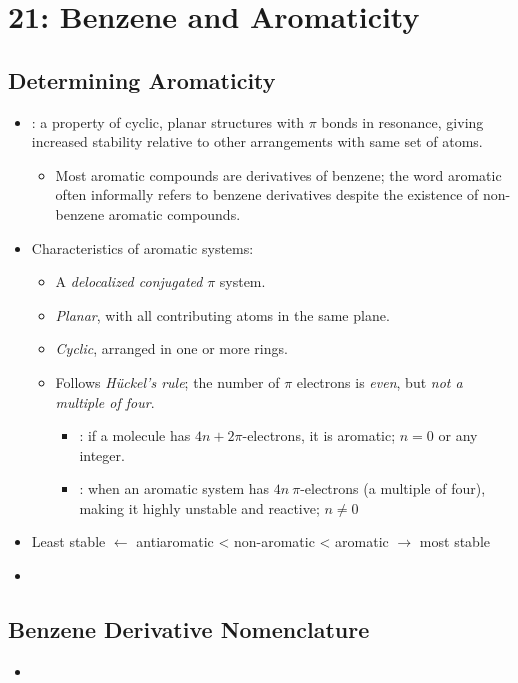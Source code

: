 \chapter{21: Benzene and Aromaticity}\label{21: Benzene and Aromaticity}

\section{Determining Aromaticity}\label{Determining Aromaticity}
\begin{itemize}
  \item {}: a property of cyclic, planar structures with \(\pi \) bonds in resonance, giving increased stability relative to other arrangements with same set of atoms.
  \begin{itemize}
    \item Most aromatic compounds are derivatives of benzene; the word aromatic often informally refers to benzene derivatives despite the existence of non-benzene aromatic compounds.
  \end{itemize}
  \item Characteristics of aromatic systems:
    \begin{itemize}
      \item A \emph{delocalized conjugated} \(\pi \) system.
      \item \emph{Planar}, with all contributing atoms in the same plane.
      \item \emph{Cyclic}, arranged in one or more rings.
      \item Follows \emph{H\"uckel's rule}; the number of \(\pi \) electrons is \emph{even}, but \emph{not a multiple of four}.
        \begin{itemize}
          \item {}: if a molecule has \(4n + 2\pi \)-electrons, it is aromatic; \(n= 0\) or any integer.
          \item {}: when an aromatic system has \(4n~\pi \)-electrons (a multiple of four), making it highly unstable and reactive; \(n\neq 0\)
        \end{itemize}
    \end{itemize}
  \item Least stable \(\leftarrow \) antiaromatic < non-aromatic < aromatic \(\rightarrow \) most stable
  \item 
\end{itemize}


\section{Benzene Derivative Nomenclature}\label{Benzene Derivative Nomenclature}
\begin{itemize}
  \item 
\end{itemize}
